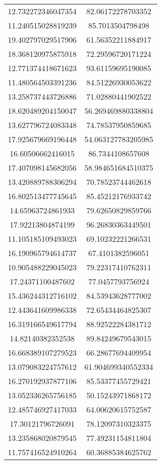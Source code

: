 \begin{table}
\begin{tabular}{cc}
12.732272346047354 & 82.06172278703352 \\
11.240515028819239 & 85.7013504798498 \\
19.402797029517906 & 61.56352211884917 \\
18.368120975875918 & 72.29596720171224 \\
12.771374418671623 & 93.61159695190085 \\
11.480564503391236 & 84.51226930053622 \\
13.258737443726886 & 71.02880441902522 \\
18.620489204150047 & 56.269469880338804 \\
13.627796724083348 & 74.78537950859685 \\
17.925679669196448 & 54.063127783205985 \\
16.60506662416015 & 86.7344108657608 \\
17.407098145682056 & 58.984651684510375 \\
13.420889788306294 & 70.78523744462618 \\
16.802513477745645 & 85.45212176933742 \\
14.65963724861933 & 79.62650829859766 \\
17.92213804874199 & 96.26830363449501 \\
11.105185109493023 & 69.10232221266531 \\
16.190965794614737 & 67.4101382596051 \\
10.905488229045023 & 79.22317410762311 \\
17.24371100487602 & 77.0457793756924 \\
15.436244312716102 & 84.53943628777002 \\
12.443641609986338 & 72.65434464825307 \\
16.319166549617794 & 88.92522284381712 \\
14.82140382352538 & 89.84249679543015 \\
16.668389107279523 & 66.28677694409954 \\
13.079083224757612 & 61.904699340552334 \\
16.270192937877106 & 85.53377455729421 \\
13.052336265756185 & 50.15243971868172 \\
12.485746927417033 & 64.00620615752587 \\
17.30121796726091 & 78.12097310323375 \\
13.235868020879545 & 77.49231154811804 \\
11.757416524910264 & 60.36885384625762 \\

\end{tabular}
\end{table}
